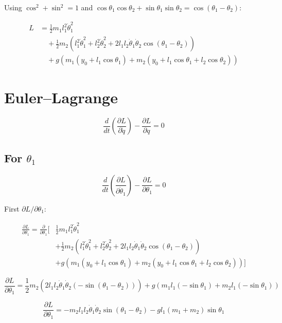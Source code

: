 \documentclass[11pt,a4paper]{article}
\begin{document}
Using $\cos^2 + \sin^2 = 1$ and $\cos\theta_1 \cos\theta_2 + \sin\theta_1 \sin\theta_2 = \cos(\theta_1 - \theta_2)$:

\begin{align*}
L &= \frac{1}{2} m_1 l_1^2 \dot{\theta}_1^2 \\
  &\quad + \frac{1}{2} m_2 \left( l_1^2 \dot{\theta}_1^2 + l_2^2 \dot{\theta}_2^2 + 2 l_1 l_2 \dot{\theta}_1 \dot{\theta}_2 \cos(\theta_1 - \theta_2) \right) \\
  &\quad + g \left( m_1 (y_0 + l_1 \cos\theta_1) + m_2 (y_0 + l_1 \cos\theta_1 + l_2 \cos\theta_2) \right)
\end{align*}

\section{Euler--Lagrange}

\[ \frac{d}{dt} \left( \frac{\partial L}{\partial \dot{q}} \right) - \frac{\partial L}{\partial q} = 0 \]

\subsection{For $\theta_1$}

\[ \frac{d}{dt} \left( \frac{\partial L}{\partial \dot{\theta}_1} \right) - \frac{\partial L}{\partial \theta_1} = 0 \]

First $\partial L / \partial \theta_1$:

\begin{align*}
\frac{\partial L}{\partial \theta_1} = \frac{\partial}{\partial \theta_1} \Big[
  &\frac{1}{2} m_1 l_1^2 \dot{\theta}_1^2 \\
  &+ \frac{1}{2} m_2 \left( l_1^2 \dot{\theta}_1^2 + l_2^2 \dot{\theta}_2^2 + 2 l_1 l_2 \dot{\theta}_1 \dot{\theta}_2 \cos(\theta_1 - \theta_2) \right) \\
  &+ g \left( m_1 (y_0 + l_1 \cos\theta_1) + m_2 (y_0 + l_1 \cos\theta_1 + l_2 \cos\theta_2) \right) \Big]
\end{align*}

\[ \frac{\partial L}{\partial \theta_1} = \frac{1}{2} m_2 \left( 2 l_1 l_2 \dot{\theta}_1 \dot{\theta}_2 (-\sin(\theta_1 - \theta_2)) \right) + g \left( m_1 l_1 (-\sin\theta_1) + m_2 l_1 (-\sin\theta_1) \right) \]

\[ \frac{\partial L}{\partial \theta_1} = -m_2 l_1 l_2 \dot{\theta}_1 \dot{\theta}_2 \sin(\theta_1 - \theta_2) - g l_1 (m_1 + m_2) \sin\theta_1 \]
\end{document}
